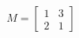 \documentclass[preview]{standalone}
\begin{document}
\begin{align*}
M = \begin{bmatrix} 1 & 3 \\ 2 & 1 \end{bmatrix}
\end{align*}
\end{document}
